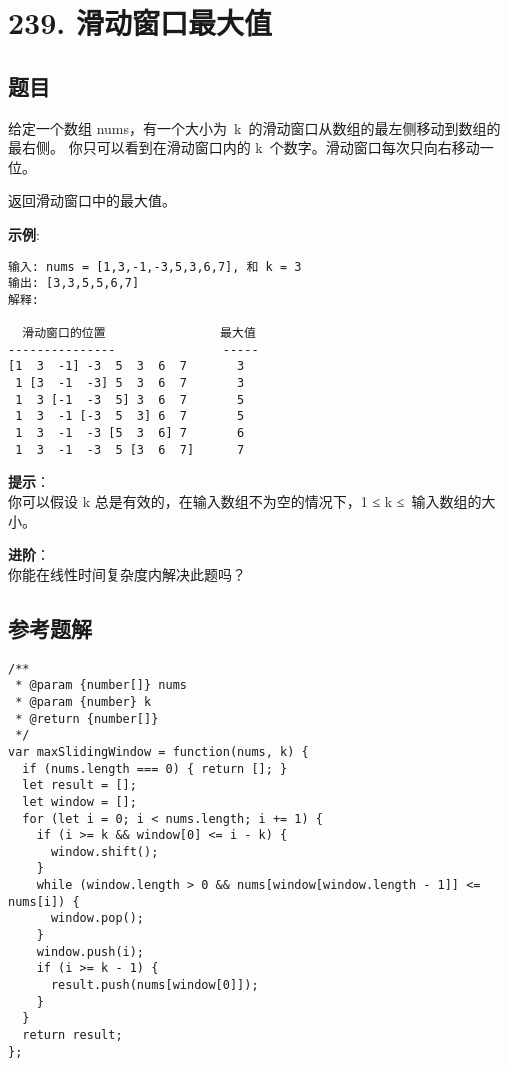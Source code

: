\newpage
\section{239. 滑动窗口最大值}
\label{leetcode:239}

\subsection{题目}

给定一个数组 nums，有一个大小为 k 的滑动窗口从数组的最左侧移动到数组的最右侧。
你只可以看到在滑动窗口内的 k 个数字。滑动窗口每次只向右移动一位。

返回滑动窗口中的最大值。

\textbf{示例}:

\begin{verbatim}
输入: nums = [1,3,-1,-3,5,3,6,7], 和 k = 3
输出: [3,3,5,5,6,7] 
解释: 

  滑动窗口的位置                最大值
---------------               -----
[1  3  -1] -3  5  3  6  7       3
 1 [3  -1  -3] 5  3  6  7       3
 1  3 [-1  -3  5] 3  6  7       5
 1  3  -1 [-3  5  3] 6  7       5
 1  3  -1  -3 [5  3  6] 7       6
 1  3  -1  -3  5 [3  6  7]      7
\end{verbatim}

\textbf{提示}：\\
你可以假设 k 总是有效的，在输入数组不为空的情况下，1 ≤ k ≤ 输入数组的大小。

\textbf{进阶}：\\
你能在线性时间复杂度内解决此题吗？

\subsection{参考题解}

\begin{verbatim}
/**
 * @param {number[]} nums
 * @param {number} k
 * @return {number[]}
 */
var maxSlidingWindow = function(nums, k) {
  if (nums.length === 0) { return []; }
  let result = [];
  let window = [];
  for (let i = 0; i < nums.length; i += 1) {
    if (i >= k && window[0] <= i - k) {
      window.shift();
    }
    while (window.length > 0 && nums[window[window.length - 1]] <= nums[i]) {
      window.pop();
    }
    window.push(i);
    if (i >= k - 1) {
      result.push(nums[window[0]]);
    }
  }
  return result;
};
\end{verbatim}
